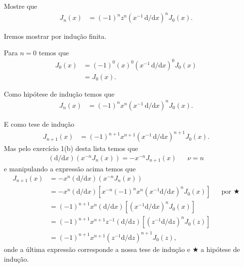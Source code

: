 \documentclass[a4paper,12pt, leqno, answers]{exam}
\begin{document}
\begin{questions}
     Mostre que
    \begin{align*}
        J_n(x) &= (-1)^n z^n \left( x^{-1} \,\mathrm{d}/\mathrm{d}x \right)^n J_0(x).
    \end{align*}
    \begin{solution}
        Iremos mostrar por indu\c{c}\~{a}o finita.

        Para $n = 0$ temos que
        \begin{align*}
            J_0(x) &= (-1)^0 (x)^0 \left( x^{-1} \,\mathrm{d}/\mathrm{d}x \right)^0 J_0(x) \\
            &= J_0(x).
        \end{align*}

        Como hip\'{o}tese de indu\c{c}\~{a}o temos que
        \begin{align*}
            J_n(x) &= (-1)^n x^n \left( x^{-1} \,\mathrm{d}/\mathrm{d}x \right)^n J_0(x).
        \end{align*}

        E como tese de indu\c{c}\~{a}o
        \begin{align*}
            J_{n + 1}(x) &= (-1)^{n + 1} x^{n + 1} \left( x^{-1} \,\mathrm{d}/\mathrm{d}x \right)^{n + 1} J_0(x).
        \end{align*}
        Mas pelo exerc\'{i}cio 1(b) desta lista temos que
        \begin{align*}
            \left( \mathrm{d}/\mathrm{d}x \right) \left( x^{-n} J_n(x) \right) = - x^{-n} J_{n + 1}(x) && \nu = n
        \end{align*}
        e manipulando a express\~{a}o acima temos que
        \begin{align*}
            J_{n + 1}(x) &= - x^n \left( \mathrm{d}/\mathrm{d}x \right) \left( x^{-n} J_n(x) \right) \\
            &= - x^n \left( \mathrm{d}/\mathrm{d}x \right) \left[ x^{-n} (-1)^n x^n \left( x^{-1} \mathrm{d}/\mathrm{d}x \right)^n J_0(x) \right] && \text{por $\bigstar$} \\
            &= (-1)^{n + 1} x^n \left( \mathrm{d}/\mathrm{d}x \right) \left[ \left( x^{-1} \mathrm{d}/\mathrm{d}x \right)^n J_0(x) \right] \\
            &= (-1)^{n + 1} x^{n + 1} z^{-1} \left( \mathrm{d}/\mathrm{d}z \right) \left[ \left( z^{-1} \mathrm{d}/\mathrm{d}z \right)^n J_0(z) \right] \\
            &= (-1)^{n + 1} x^{n + 1} \left( z^{-1} \mathrm{d}/\mathrm{d}z \right)^{n + 1} J_0(z),
        \end{align*}
        onde a \'{u}ltima express\~{a}o corresponde a nossa tese de indu\c{c}\~{a}o e $\bigstar$ a hip\'{o}tese de indu\c{c}\~{a}o.
    \end{solution}


\end{questions}
\end{document}
